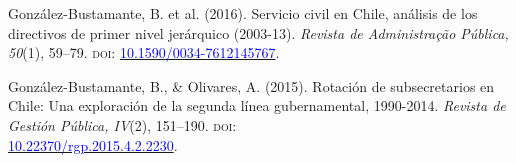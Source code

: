 \begin{publications}
\begin{benumerate}{10}
\item{\small González-Bustamante, B. et al. (2016). Servicio civil en Chile, análisis de los directivos de primer nivel jerárquico (2003-13). {\itshape Revista de Administra\c{c}\~ao Pública, 50}(1), 59--79. {\scshape doi}: \href{http://dx.doi.org/10.1590/0034-7612145767}{\textcolor{blue}{10.1590/0034-7612145767}}.} \vspace{1mm}


\item{\small González-Bustamante, B., \& Olivares, A. (2015). Rotación de subsecretarios en Chile: Una exploración de la segunda línea gubernamental, 1990-2014. {\itshape Revista de Gestión Pública, IV}(2), 151--190. {\scshape doi}: \\ \href{https://doi.org/10.22370/rgp.2015.4.2.2230}{\textcolor{blue}{10.22370/rgp.2015.4.2.2230}}.} \vspace{1mm}

\end{benumerate}

\end{publications}


